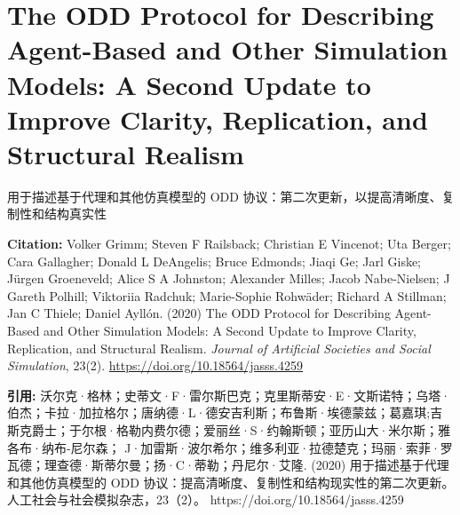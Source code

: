 \vspace{0.5em}
\chapter{The ODD Protocol for Describing Agent-Based and Other Simulation Models: A Second Update to Improve Clarity, Replication, and Structural Realism}
\begin{center}\small 用于描述基于代理和其他仿真模型的 ODD 协议：第二次更新，以提高清晰度、复制性和结构真实性\end{center}

\noindent\textbf{Citation:} Volker Grimm; Steven F Railsback; Christian E Vincenot; Uta Berger; Cara Gallagher; Donald L DeAngelis; Bruce Edmonds; Jiaqi Ge; Jarl Giske; Jürgen Groeneveld; Alice S A Johnston; Alexander Milles; Jacob Nabe-Nielsen; J Gareth Polhill; Viktoriia Radchuk; Marie-Sophie Rohwäder; Richard A Stillman; Jan C Thiele; Daniel Ayllón. (2020) The ODD Protocol for Describing Agent-Based and Other Simulation Models: A Second Update to Improve Clarity, Replication, and Structural Realism. \textit{Journal of Artificial Societies and Social Simulation}, 23(2). \url{https://doi.org/10.18564/jasss.4259}

\vspace{0.5em}
\noindent\textbf{引用:} 沃尔克·格林；史蒂文·F·雷尔斯巴克；克里斯蒂安·E·文斯诺特；乌塔·伯杰；卡拉·加拉格尔；唐纳德·L·德安吉利斯；布鲁斯·埃德蒙兹；葛嘉琪;吉斯克爵士；于尔根·格勒内费尔德；爱丽丝·S·约翰斯顿；亚历山大·米尔斯；雅各布·纳布-尼尔森； J·加雷斯·波尔希尔；维多利亚·拉德楚克；玛丽·索菲·罗瓦德；理查德·斯蒂尔曼；扬·C·蒂勒；丹尼尔·艾隆. (2020) 用于描述基于代理和其他仿真模型的 ODD 协议：提高清晰度、复制性和结构现实性的第二次更新。人工社会与社会模拟杂志，23（2）。 https://doi.org/10.18564/jasss.4259

